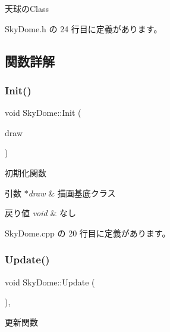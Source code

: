天球の\+Class 

 Sky\+Dome.\+h の 24 行目に定義があります。



\subsection{関数詳解}
\mbox{\label{class_sky_dome_ac49a643482a76d1fb27be67a53245502}} 
\subsubsection{\texorpdfstring{Init()}{Init()}}
{\footnotesize\ttfamily void Sky\+Dome\+::\+Init (\begin{DoxyParamCaption}\item[{\mbox{\hyperlink{class_draw_base}{Draw\+Base}} $\ast$}]{draw }\end{DoxyParamCaption})}



初期化関数 


\begin{DoxyParams}{引数}
{\em $\ast$draw} & 描画基底クラス \\
\hline
\end{DoxyParams}

\begin{DoxyRetVals}{戻り値}
{\em void} & なし \\
\hline
\end{DoxyRetVals}


 Sky\+Dome.\+cpp の 20 行目に定義があります。

\mbox{\label{class_sky_dome_ad9b9bfc252cbdc373dfca964430bdb89}} 
\subsubsection{\texorpdfstring{Update()}{Update()}}
{\footnotesize\ttfamily void Sky\+Dome\+::\+Update (\begin{DoxyParamCaption}{ }\end{DoxyParamCaption})\hspace{0.3cm}{\ttfamily [override]}, {\ttfamily [virtual]}}



更新関数 


